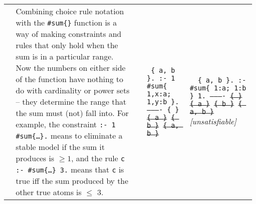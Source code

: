 \documentclass[10pt,a4paper,landscape]{article}
\begin{document}
\begin{longtable}{p{3cm}p{14cm}lp{3.5cm}p{3.5cm}}
		& Combining choice rule notation with the \texttt{\#sum\{\}} function is a way of making constraints and rules that only hold when the sum is in a particular range. 
		Now the numbers on either side of the function have nothing to do with cardinality or power sets -- they determine the range that the sum must (not) fall into.
		For example, the constraint \texttt{:- 1 \#sum\{\ldots\}.} means to eliminate a stable model if the sum it produces is $\geq 1$, and the rule \texttt{c :- \#sum\{\ldots\} 3.} means that \texttt{c} is true iff the sum produced by the other true atoms is $\leq$ 3.

		&&\texttt{%
			{\scriptsize
			\{ a, b \}. \newline	
			:- 1 \#sum\{ 1,x:a; 1,y:b \}. \newline
			---------- \newline
			\{ \} \newline
			\sout{\{ a \}} \newline
			\sout{\{ b \}} \newline
			\sout{\{ a, b \}} }}
		& \texttt{%
			{\scriptsize
				\{ a, b \}. \newline	
				:- \#sum\{ 1:a; 1:b \} 1. \newline
				---------- \newline
				\sout{\{ \}} \newline
				\sout{\{ a \}} \newline
				\sout{\{ b \}} \newline
				\sout{\{ a, b \}} } } \newline
			\textit{[unsatisfiable]}
	
\end{longtable}
	
\end{document}
